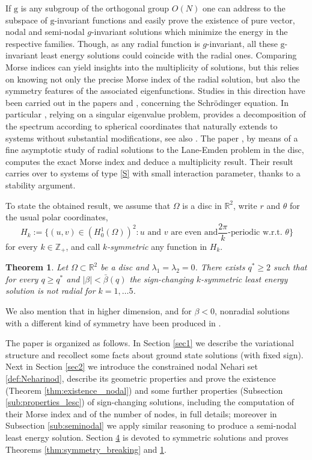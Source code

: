 \documentclass[10pt,a4paper]{amsart}
\numberwithin{equation}{section}
\newtheorem{theorem}[theo]{Theorem}
\begin{document}
If ${\mathrm g}$ is any subgroup of the orthogonal group $O(N)$ one can address to the
subspace of $\mathrm g$-invariant functions
and easily prove the existence of pure vector, nodal and semi-nodal $g$-invariant
solutions which minimize the energy in the respective families.
Though, as any radial function is $g$-invariant, all these $\mathrm g$-invariant
least energy solutions could coincide with the radial ones.
Comparing Morse indices can yield insights into the multiplicity of solutions,
but this relies on knowing not only the precise Morse index of the radial solution,
but also the symmetry features of the associated eigenfunctions.
Studies in this direction have been carried out in the papers \cite{AmaGla20NARWA}
and \cite{GlaIan23Nodea}, concerning the Schr\"odinger equation.
In particular \cite{AmaGla20NARWA}, relying on a singular eigenvalue problem,
provides a decomposition of the spectrum according to spherical coordinates that
naturally extends to systems without substantial modifications,
see also \cite{Ama24JEPE}.
The paper \cite{GlaIan23Nodea}, by means of a fine asymptotic study of radial
solutions to the Lane-Emden problem in the disc, computes the exact Morse index and
deduce a multiplicity result.
Their result  carries over to systems of type \eqref{S} with small interaction
parameter, thanks to a stability argument.

To state the obtained result, we assume that $\Omega$ is a disc in $\mathbb{R}^2$,
write $r$ and $\theta$ for the usual polar coordinates,
\[
H_{k}:=\big\{(u,v)\in \left(H^1_0(\Omega)\right)^2  : \text{$u$ and $v$ are even and
$\frac{2\pi}{k}$-periodic w.r.t. $\theta$} \big\}
\]
for every $k\in \mathbb Z_+$, and call \emph{$k$-symmetric} any function in $H_k$.

\begin{theorem}\label{thm:ksym}
Let $\Omega\subset \mathbb{R}^2$ be a disc and $\lambda_1=\lambda_2=0$. There exists
$q^*\ge 2$ such that for every $q\ge q^*$ and $|\beta|< \bar\beta(q)$ the sign-changing
$k$-symmetric least energy solution is not radial for $k=1,\dots 5$.
\end{theorem}

We also mention that in higher dimension, and for $\beta<0$, nonradial solutions
with a different kind of symmetry have been produced in \cite{CS_CCM23}.

The paper is organized as follows. In Section \ref{sec1} we describe the variational
structure and recollect some facts about ground state solutions (with fixed sign).
Next in Section \ref{sec2} we introduce the constrained nodal Nehari set
\eqref{def:Neharinod}, describe its geometric properties and prove the existence
(Theorem \ref{thm:existence_ nodal}) and some further properties
(Subsection \ref{sub:properties_lesc}) of sign-changing solutions, including the
computation of their Morse index and of the number of nodes, in full details;
moreover in Subsection \ref{sub:seminodal} we apply similar reasoning to produce a
semi-nodal least energy solution.
Section \href{https://ejde.math.txstate.edu/Volumes/2026/08/amadori.pdf}{4} is devoted to symmetric solutions and proves Theorems
\ref{thm:symmetry_breaking} and \ref{thm:ksym}.
\end{document}
